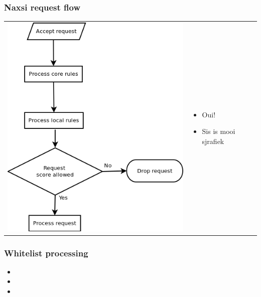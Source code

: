 \begin{frame}
  \frametitle{Naxsi request flow}
\begin{tabular}{ll}
\begin{minipage}[c]{0.3\textwidth}
\includegraphics[width=\textwidth]{../paper/images/naxsi_flow.png}
\end{minipage}
&
\begin{minipage}[c]{0.7\textwidth}
  \begin{itemize}
   \item Oui!
   \item Sis is mooi sjrafiek
  \end{itemize}
\end{minipage}
\end{tabular}
\end{frame}


\begin{frame}
  \frametitle{Whitelist processing}
   \begin{itemize}
   \item 
   \item 
   \item
  \end{itemize}
\end{frame}



